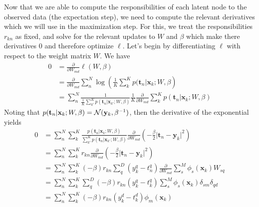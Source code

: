 Now that we are able to compute the responsibilities of each latent node to the observed data (the expectation step), we need to compute the relevant derivatives which we will use in the maximization step. For this, we treat the responsibilities $r_{kn}$ as fixed, and solve for the relevant updates to $W$ and $\beta$ which make there derivatives $0$ and therefore optimize $\ell$. Let's begin by differentiating $\ell$ with respect to the weight matrix $W$. We have
\begin{align}
    0 &= \frac{\partial}{\partial W_{md}}\ell(W,\beta) \\
    &= \frac{\partial}{\partial W_{md}}\sum_n^N\log\left( \frac{1}{K}\sum_k^Kp(\mathbf{t}_n \vert \mathbf{x}_k; W, \beta \right) \\
    &= \sum_n^N \frac{1}{\frac{1}{K}\sum_{k'}^Kp(\mathbf{t}_n\vert \mathbf{x}_{k'};W,\beta)}\frac{1}{K}\frac{\partial}{\partial W_{md}}\sum_k^Kp(\mathbf{t}_n\vert \mathbf{x}_k;W,\beta)
\end{align}
Noting that $p(\mathbf{t}_n\vert\mathbf{x}_k;W,\beta)=\mathcal{N}(\mathbf{y}_k,\beta^{-1})$, then the derivative of the exponential yields
\begin{align}
  0 &= \sum_n^N\sum_k^K \frac{p(\mathbf{t}_n\vert\mathbf{x}_k;W,\beta)}{\sum_{k'}^Kp(\mathbf{t}_n\vert\mathbf{x}_{k'};W,\beta)}\frac{\partial}{\partial W_{md}}\left(-\frac{\beta}{2}\lvert \mathbf{t}_n-\mathbf{y}_k \rvert^2 \right) \\
  &= \sum_n^N\sum_k^K r_{kn}\frac{\partial}{\partial W_{md}}\left(-\frac{\beta}{2}\lvert \mathbf{t}_n-\mathbf{y}_k \rvert^2 \right) \\
  &= \sum_n^N\sum_k^K (-\beta) r_{kn} \sum_q^D(y_k^q-t_n^q)\frac{\partial}{\partial W_{md}}\sum_s^M \phi_s(\mathbf{x}_k)W_{sq} \\
  &= \sum_n^N\sum_k^K\sum_q^D(-\beta)r_{kn}(y_k^q-t_k^q)\sum_s^M \phi_s(\mathbf{x}_k)\delta_{sm}\delta_{qd} \\
  &= \sum_n^N\sum_k^K (-\beta)r_{kn}(y_k^d-t_k^d) \phi_m(\mathbf{x}_k) 
\end{align}

